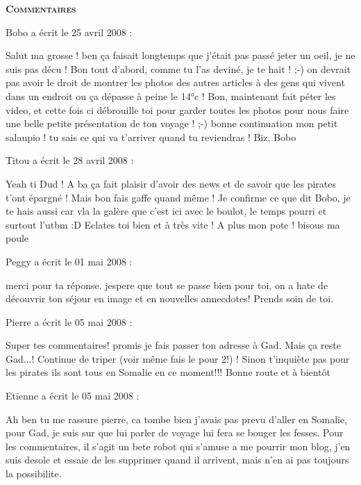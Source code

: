 \bigskip
\textbf{\textsc{Commentaires}}

\medskip
Bobo a écrit le 25 avril 2008 :
\begin{displayquote}
Salut ma grosse ! ben ça faisait longtemps que j'était pas passé jeter un oeil, je ne suis pas décu ! 
Bon tout d'abord, comme tu l'as deviné, je te hait ! ;-) on devrait pas avoir le droit de montrer les photos des autres articles à des gens qui vivent dans un endroit ou ça dépasse à peine le 14°c !
Bon, maintenant fait péter les video, et cette fois ci débrouille toi pour garder toutes les photos pour nous faire une belle petite présentation de ton voyage ! ;-)
bonne continuation mon petit salaupio ! tu sais ce qui va t'arriver quand tu reviendras !
Biz, Bobo
\end{displayquote}

\medskip
Titou a écrit le 28 avril 2008 :
\begin{displayquote}
Yeah ti Dud !
A ba ça fait plaisir d'avoir des news et de savoir que les pirates t'ont épargné ! Mais bon fais gaffe quand même !
Je confirme ce que dit Bobo, je te hais aussi car vla la galère que c'est ici avec le boulot, le temps pourri et surtout l'utbm :D Eclates toi bien et à très vite !
A plus mon pote !
bisous ma poule
\end{displayquote}

\medskip
Peggy a écrit le 01 mai 2008 :
\begin{displayquote}
merci pour ta réponse. jespere que tout se passe bien pour toi, on a hate de découvrir ton séjour en image et en nouvelles annecdotes!
Prends soin de toi.
\end{displayquote}

\medskip
Pierre a écrit le 05 mai 2008 :
\begin{displayquote}
Super tes commentaires!
promis je fais passer ton adresse à Gad.
Mais ça reste Gad...!
Continue de triper (voir même fais le pour 2!) !
Sinon t'inquiète pas pour les pirates ils sont tous en Somalie en ce moment!!!
Bonne route et à bientôt
\end{displayquote}

\medskip
Etienne a écrit le 05 mai 2008 :
\begin{displayquote}
Ah ben tu me rassure pierre, ca tombe bien j'avais pas prevu d'aller en Somalie, pour Gad, je suis sur que lui parler de voyage lui fera se bouger les fesses.
Pour les commentaires, il s'agit un bete robot qui s'amuse a me pourrir mon blog, j'en suis desole et essaie de les supprimer quand il arrivent, mais n'en ai pas toujours la possibilite.
\end{displayquote}

